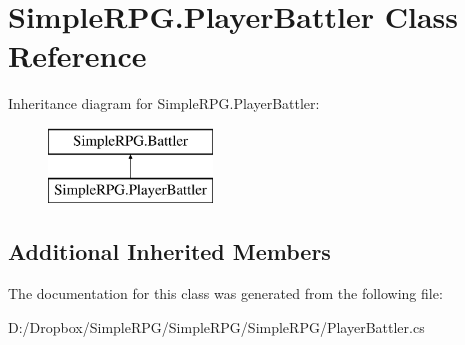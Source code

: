 \hypertarget{class_simple_r_p_g_1_1_player_battler}{\section{Simple\+R\+P\+G.\+Player\+Battler Class Reference}
\label{class_simple_r_p_g_1_1_player_battler}
}
Inheritance diagram for Simple\+R\+P\+G.\+Player\+Battler\+:\begin{figure}[H]
\begin{center}
\leavevmode
\includegraphics[height=2.000000cm]{class_simple_r_p_g_1_1_player_battler}
\end{center}
\end{figure}
\subsection*{Additional Inherited Members}


The documentation for this class was generated from the following file\+:\begin{DoxyCompactItemize}
\item 
D\+:/\+Dropbox/\+Simple\+R\+P\+G/\+Simple\+R\+P\+G/\+Simple\+R\+P\+G/Player\+Battler.\+cs\end{DoxyCompactItemize}
